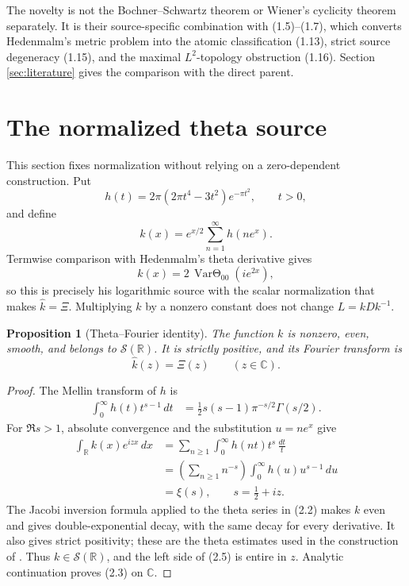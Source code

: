 \documentclass[11pt]{article}
\newtheorem{proposition}[theorem]{Proposition}
\newcommand{\C}{\mathbb C}
\newcommand{\R}{\mathbb R}
\newcommand{\cS}{\mathcal S}
\begin{document}
The novelty is not the Bochner--Schwartz theorem or Wiener's cyclicity theorem separately.
It is their source-specific combination with (1.5)--(1.7), which converts Hedenmalm's metric
problem into the atomic classification (1.13), strict source degeneracy (1.15), and the maximal
\(L^2\)-topology obstruction (1.16).  Section \ref{sec:literature} gives the comparison with the
direct parent.

\section{The normalized theta source}\label{sec:source}

This section fixes normalization without relying on a zero-dependent construction.  Put
\[
 h(t)=2\pi(2\pi t^4-3t^2)e^{-\pi t^2},\qquad t>0,
 \tag{2.1}
\]
and define
\[
k(x)=e^{x/2}\sum_{n=1}^{\infty}h(ne^x).
\tag{2.2}
\]
Termwise comparison with Hedenmalm's theta derivative gives
\[
 k(x)=2\,\mathop{\mathrm{Var}\Theta}_{00}(i e^{2x}),
\]
so this is precisely his logarithmic source with the scalar normalization that makes
\(\widehat k=\Xi\).  Multiplying \(k\) by a nonzero constant does not change \(L=kDk^{-1}\).

\begin{proposition}[Theta--Fourier identity]\label{prop:theta-fourier}
The function \(k\) is nonzero, even, smooth, and belongs to \(\cS(\R)\).  It is strictly positive,
and its Fourier transform is
\[
 \widehat k(z)=\Xi(z)\qquad(z\in\C).
 \tag{2.3}
\]
\end{proposition}

\begin{proof}
The Mellin transform of \(h\) is
\[
\begin{aligned}
 \int_0^\infty h(t)t^{s-1}\,dt
 &=\frac12s(s-1)\pi^{-s/2}\Gamma(s/2).
\end{aligned}
\tag{2.4}
\]
For \(\Re s>1\), absolute convergence and the substitution \(u=ne^x\) give
\[
\begin{aligned}
 \int_{\R}k(x)e^{i z x}\,dx
 &=\sum_{n\ge1}\int_0^\infty h(nt)t^{s}\,\frac{dt}{t}\\
 &=\left(\sum_{n\ge1}n^{-s}\right)
   \int_0^\infty h(u)u^{s-1}\,du\\
 &=\xi(s),\qquad s=\frac12+iz.
\end{aligned}
\tag{2.5}
\]
The Jacobi inversion formula applied to the theta series in (2.2) makes \(k\) even and gives
double-exponential decay, with the same decay for every derivative.  It also gives strict
positivity; these are the theta estimates used in the construction of
\cite{Hedenmalm2026}.  Thus \(k\in\cS(\R)\), and the left side of (2.5) is entire in \(z\).
Analytic continuation proves (2.3) on \(\C\).
\end{proof}
\end{document}
